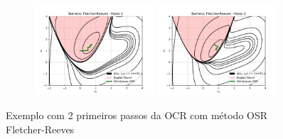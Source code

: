 \documentclass[10pt, a4paper]{article}
\begin{document}
\begin{figure}[H]
  \centering
  \begin{subfigure}[b]{\textwidth}
    \includegraphics[width=0.49\textwidth]{fig_p1/Barreira_Fletcher-Reeves_1.pdf}
    \includegraphics[width=0.49\textwidth]{fig_p1/Barreira_Fletcher-Reeves_2.pdf}
  \end{subfigure}
  \caption{Exemplo com 2 primeiros passos da OCR com método OSR Fletcher-Reeves }
\end{figure}
\end{document}
